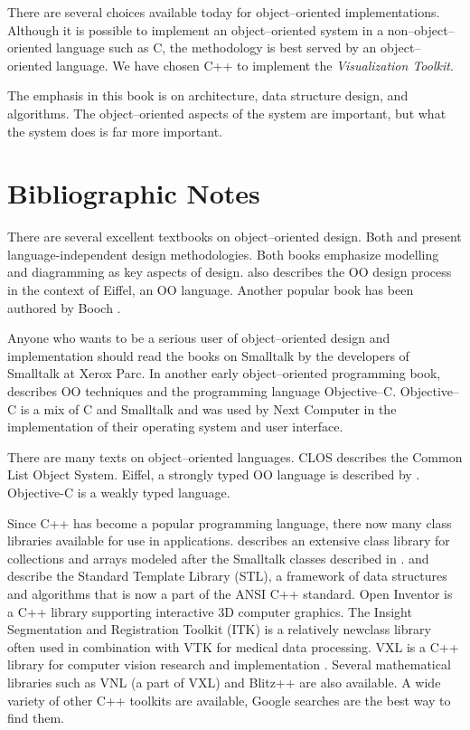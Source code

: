 There are several choices available today for object--oriented implementations. Although it is possible to implement an object--oriented system in a non--object--oriented language such as C, the methodology is best served by an object--oriented language. We have chosen C++ to implement the \emph{Visualization Toolkit}.

The emphasis in this book is on architecture, data structure design, and algorithms. The object--oriented aspects of the system are important, but what the system does is far more important.

\section{Bibliographic Notes}
There are several excellent textbooks on object--oriented design.
Both \cite{Rumbaugh91} and \cite{Birtwistle79} present language-independent design methodologies.
Both books emphasize modelling and diagramming as key aspects of design.
\cite{Meyer88} also describes the OO design process in the context of Eiffel, an OO language.
Another popular book has been authored by Booch \cite{Booch91}.

Anyone who wants to be a serious user of object--oriented design and implementation should read the books on Smalltalk \cite{Goldberg83} \cite{Goldberg84} by the developers of Smalltalk at Xerox Parc.
In another early object--oriented programming book, \cite{Cox86} describes OO techniques and the programming language Objective--C.
Objective--C is a mix of C and Smalltalk and was used by Next Computer in the implementation of their operating system and user interface.

There are many texts on object--oriented languages. CLOS \cite{Keene89} describes the Common List Object System. Eiffel, a strongly typed OO language is described by \cite{Meyer88} .
Objective-C \cite{Cox86} is a weakly typed language.

Since C++ has become a popular programming language, there now many class libraries available for use in applications.
\cite{Gorlen90} describes an extensive class library for collections and arrays modeled after the Smalltalk classes described in \cite{Goldberg83} .
\cite{Stepanov94} and \cite{Musser94} describe the Standard Template Library (STL), a framework of data structures and algorithms that is now a part of the ANSI C++ standard. Open Inventor \cite{Inventor} is a C++ library supporting interactive 3D computer graphics.
The Insight Segmentation and Registration Toolkit (ITK) is a relatively newclass library often used in combination with VTK \cite{ITK} for medical data processing. VXL is a C++ library for computer vision research and implementation \cite{VXL}.
Several mathematical libraries such as VNL (a part of VXL) and Blitz++ \cite{Blitz} are also available. A wide variety of other C++ toolkits are available, Google searches \cite{Google} are the best way to find them.

